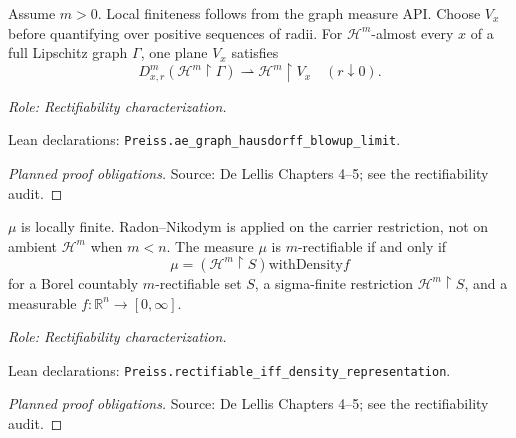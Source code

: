 \begin{lemma}
\label{lem:graph-blowup}







Assume \(m>0\). Local finiteness follows from the graph measure API. Choose \(V_x\) before quantifying over positive sequences of radii.
For \(\mathcal H^m\)-almost every \(x\) of a full Lipschitz graph \(\Gamma\), one plane \(V_x\) satisfies
\[
 D^m_{x,r}(\mathcal H^m\!\restriction\Gamma)
 \rightharpoonup\mathcal H^m\!\restriction V_x
 \quad(r\downarrow0).
\]
\par\emph{Role: Rectifiability characterization.}
\par Lean declarations: \texttt{Preiss.ae\_graph\_hausdorff\_blowup\_limit}.
\end{lemma}
\begin{proof}[Planned proof obligations]

\par Source: De Lellis Chapters 4--5; see the rectifiability audit.
\end{proof}

\begin{lemma}
\label{lem:representation}







\(\mu\) is locally finite. Radon--Nikodym is applied on the carrier restriction, not on ambient \(\mathcal H^m\) when \(m<n\).
The measure \(\mu\) is \(m\)-rectifiable if and only if
\[
 \mu=(\mathcal H^m\!\restriction S)\mathbin{\mathrm{withDensity}} f
\]
for a Borel countably \(m\)-rectifiable set \(S\), a sigma-finite restriction \(\mathcal H^m\!\restriction S\), and a measurable \(f:\mathbb R^n\to[0,\infty]\).
\par\emph{Role: Rectifiability characterization.}
\par Lean declarations: \texttt{Preiss.rectifiable\_iff\_density\_representation}.
\end{lemma}
\begin{proof}[Planned proof obligations]

\par Source: De Lellis Chapters 4--5; see the rectifiability audit.
\end{proof}

